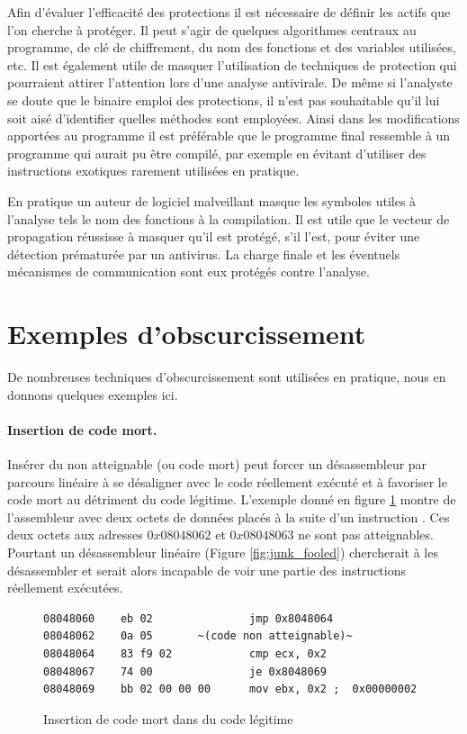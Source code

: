 Afin d'évaluer l'efficacité des protections il est nécessaire de définir les actifs que l'on cherche à protéger. 
Il peut s'agir de quelques algorithmes centraux au programme, de clé de chiffrement, du nom des fonctions et des variables utilisées, etc.
Il est également utile de masquer l'utilisation de techniques de protection qui pourraient attirer l'attention lors d'une analyse antivirale. De même si l'analyste se doute que le binaire emploi des protections, il n'est pas souhaitable qu'il lui soit aisé d'identifier quelles méthodes sont employées. Ainsi dans les modifications apportées au programme il est préférable que le programme final ressemble à un programme qui aurait pu être compilé, par exemple en évitant d'utiliser des instructions exotiques rarement utilisées en pratique.


En pratique un auteur de logiciel malveillant masque les symboles utiles à l'analyse tels le nom des fonctions à la compilation. Il est utile que le vecteur de propagation réussisse à masquer qu'il est protégé, s'il l'est, pour éviter une détection prématurée par un antivirus. La charge finale et les éventuels mécanismes de communication sont eux protégés contre l'analyse.

\section{Exemples d'obscurcissement}
De nombreuses techniques d'obscurcissement sont utilisées en pratique, nous en donnons quelques exemples ici.

\paragraph{Insertion de code mort.}
Insérer du non atteignable (ou code mort) peut forcer un désassembleur par parcours linéaire à se désaligner avec le code réellement exécuté et à favoriser le code mort au détriment du code légitime.
L'exemple donné en figure \ref{fig:junk_right} montre de l'assembleur avec deux octets de données placés à la suite d'un instruction \jmp. Ces deux octets aux adresses $0x08048062$ et $0x08048063$ ne sont pas atteignables. Pourtant un désassembleur linéaire (Figure \ref{fig:junk_fooled}) chercherait à les désassembler et serait alors incapable de voir une partie des instructions réellement exécutées.


\begin{figure}
\begin{lstlisting}[language={[x86masm]Assembler}, escapechar=~]
08048060    eb 02               jmp 0x8048064
08048062    0a 05		~(code non atteignable)~
08048064    83 f9 02            cmp ecx, 0x2
08048067    74 00               je 0x8048069
08048069    bb 02 00 00 00      mov ebx, 0x2 ;  0x00000002
\end{lstlisting}
\caption{Insertion de code mort dans du code légitime}
\label{fig:junk_right}
\end{figure}

